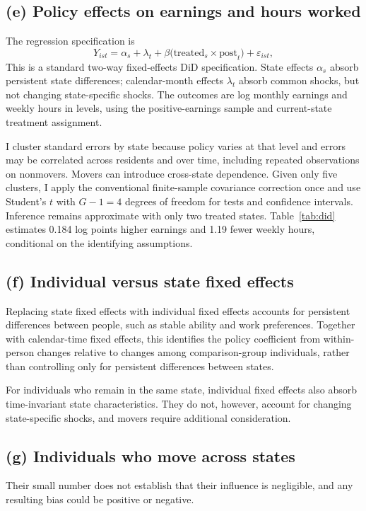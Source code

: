 \documentclass[12pt]{article}
\begin{document}
\subsection*{(e) Policy effects on earnings and hours worked}
The regression specification is
\begin{equation}
    Y_{ist} = \alpha_s + \lambda_t
    + \beta\bigl(\mathrm{treated}_s \times \mathrm{post}_t\bigr)
    + \varepsilon_{ist},
    \label{eq:did}
\end{equation}
This is a standard two-way fixed-effects DiD specification. State effects
$\alpha_s$ absorb persistent state differences; calendar-month effects
$\lambda_t$ absorb common shocks, but not changing state-specific shocks.
The outcomes are log monthly earnings and weekly hours in levels, using
the positive-earnings sample and current-state treatment assignment.

I cluster standard errors by state because policy varies at that level and
errors may be correlated across residents and over time, including repeated
observations on nonmovers. Movers can introduce cross-state dependence.
Given only five clusters, I apply the conventional finite-sample covariance
correction once and use Student's $t$ with $G-1=4$ degrees of freedom for
tests and confidence intervals. Inference remains approximate with only
two treated states. Table~\ref{tab:did} estimates 0.184 log points higher
earnings and 1.19 fewer weekly hours, conditional on the identifying
assumptions.

\FloatBarrier

\subsection*{(f) Individual versus state fixed effects}
Replacing state fixed effects with individual fixed effects accounts for persistent differences between people, such as stable ability and work preferences. Together with calendar-time fixed effects, this identifies the policy coefficient from within-person changes relative to changes among comparison-group individuals, rather than controlling only for persistent differences between states.

For individuals who remain in the same state, individual fixed effects also absorb time-invariant state characteristics. They do not, however, account for changing state-specific shocks, and movers require additional consideration.


\subsection*{(g) Individuals who move across states}
Their small number does not establish that their influence is negligible, and any resulting bias could be positive or negative.
\end{document}
